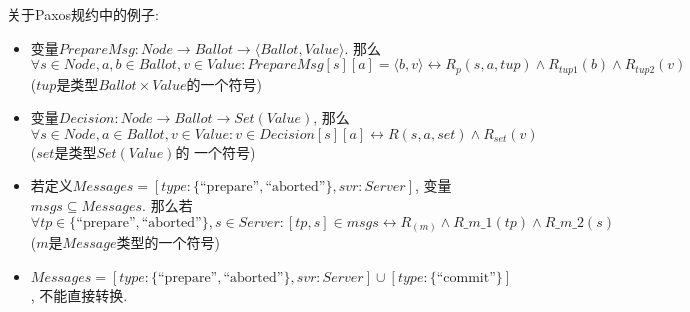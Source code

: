 关于Paxos规约中的例子:
\begin{itemize}
  \item 变量$PrepareMsg : Node \rightarrow Ballot \rightarrow \langle Ballot,Value\rangle $. 
        那么$ \forall s\in Node, a,b\in Ballot, v\in Value: PrepareMsg[s][a] = \langle b,v\rangle
          \leftrightarrow R_p(s,a,tup) \wedge R_{tup1}(b) \wedge R_{tup2}(v)$ ($tup$是类型$Ballot\times Value$的一个符号)
  \item 变量$Decision : Node \rightarrow Ballot \rightarrow Set(Value)$, 那么$\forall s \in Node, a \in Ballot,
          v \in Value: v \in Decision[s][a] \leftrightarrow R(s,a,set) \wedge R_{set}(v)$ ($set$是类型$Set(Value)$的
          一个符号)
  \item 若定义$Messages = [type : \{\text{``prepare''} ,\text{``aborted''}\}, svr : Server]$, 变量$msgs \subseteq Messages$. 
          那么若$\forall tp \in \{\text{``prepare''},\text{``aborted''} \}, s \in Server : [tp,s] \in msgs \leftrightarrow
           R_(m) \wedge R\_m\_1(tp) \wedge R\_m\_2(s)$ ($m$是$Message$类型的一个符号)
  \item $Messages = [type : \{\text{``prepare''} ,\text{``aborted''}\}, svr : Server] \cup [type : \{\text{``commit''}\}]$, 不能直接转换.
\end{itemize}


